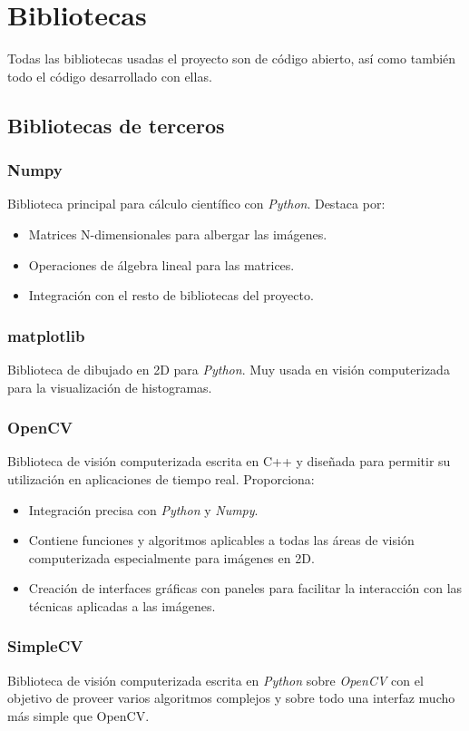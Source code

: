 \chapter{Bibliotecas}
Todas las bibliotecas usadas el proyecto son de código abierto, así
como también todo el código desarrollado con ellas.

\section{Bibliotecas de terceros}
\subsection{Numpy}
Biblioteca principal para cálculo científico con \emph{Python}. Destaca por:
\begin{itemize}
\item Matrices N-dimensionales para albergar las imágenes.
\item Operaciones de álgebra lineal para las matrices.
\item Integración con el resto de bibliotecas del proyecto.
\end{itemize}

\subsection{matplotlib}
Biblioteca de dibujado en 2D para \emph{Python}. Muy usada en visión
computerizada para la visualización de histogramas.

\subsection{OpenCV}
Biblioteca de visión computerizada escrita en C++ y diseñada para
permitir su utilización en aplicaciones de tiempo real. Proporciona:
\begin{itemize}
\item Integración precisa con \emph{Python} y \emph{Numpy}.
\item Contiene funciones y algoritmos aplicables a todas las áreas de
  visión computerizada especialmente para imágenes en 2D.
\item Creación de interfaces gráficas con paneles para
  facilitar la interacción con las técnicas aplicadas a las imágenes.
\end{itemize}

\subsection{SimpleCV}
Biblioteca de visión computerizada escrita en \emph{Python} sobre
\emph{OpenCV} con el objetivo de proveer varios algoritmos complejos y
sobre todo una interfaz mucho más simple que OpenCV\@.

